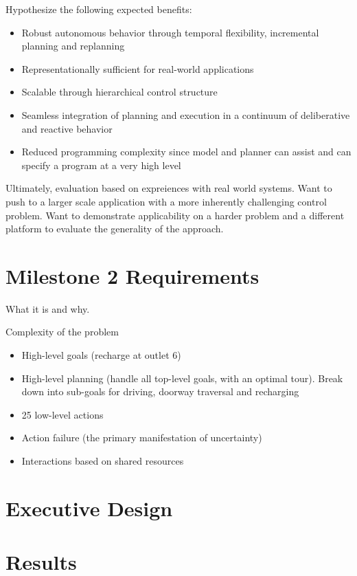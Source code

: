 \documentclass[letterpaper]{article}
\begin{document}
Hypothesize the following expected benefits:
\begin{itemize}
\item Robust autonomous behavior through temporal flexibility, incremental planning and replanning
\item Representationally sufficient for real-world applications
\item Scalable through hierarchical control structure
\item Seamless integration of planning and execution in a continuum of deliberative and reactive behavior
\item Reduced programming complexity since model and planner can assist and can specify a program at a very high level
\end{itemize}

Ultimately, evaluation based on expreiences with real world systems. Want to push to a larger scale application with a more inherently challenging control problem. Want to demonstrate applicability on a harder problem and a different platform to evaluate the generality of the approach.

\section{Milestone 2 Requirements}

What it is and why.

Complexity of the problem
\begin{itemize}
\item High-level goals (recharge at outlet 6)
\item High-level planning (handle all top-level goals, with an optimal tour). Break down into sub-goals for driving, doorway traversal and recharging
\item 25 low-level actions
\item Action failure (the primary manifestation of uncertainty)
\item Interactions based on shared resources
\end{itemize}

\section{Executive Design}

\section{Results}
\end{document}
